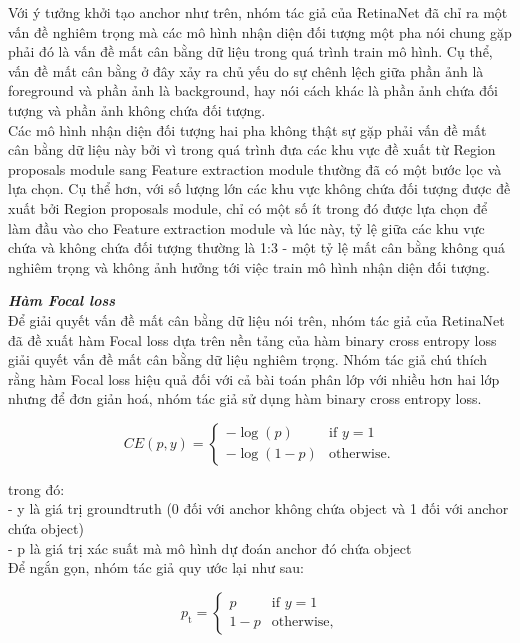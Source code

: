 {    \noindent
    Với ý tưởng khởi tạo anchor như trên, nhóm tác giả của RetinaNet đã chỉ ra một vấn đề nghiêm trọng mà các mô hình nhận diện đối tượng một pha nói chung gặp phải đó là vấn đề mất cân bằng dữ liệu trong quá trình train mô hình.
    Cụ thể, vấn đề mất cân bằng ở đây xảy ra chủ yếu do sự chênh lệch giữa phần ảnh là foreground và phần ảnh là background, hay nói cách khác là phần ảnh chứa đối tượng và phần ảnh không chứa đối tượng. \\
    Các mô hình nhận diện đối tượng hai pha không thật sự gặp phải vấn đề mất cân bằng dữ liệu này bởi vì trong quá trình đưa các khu vực đề xuất từ Region proposals module sang Feature extraction module thường đã có một bước lọc và lựa chọn.
    Cụ thể hơn, với số lượng lớn các khu vực không chứa đối tượng được đề xuất bởi Region proposals module, chỉ có một số ít trong đó được lựa chọn để làm đầu vào cho Feature extraction module và lúc này, tỷ lệ giữa các khu vực chứa và không chứa đối tượng thường là 1:3 - một tỷ lệ mất cân bằng không quá nghiêm trọng và không ảnh hưởng tới việc train mô hình nhận diện đối tượng.

    \noindent
    \textbf{\textit{Hàm Focal loss}} \\
    Để giải quyết vấn đề mất cân bằng dữ liệu nói trên, nhóm tác giả của RetinaNet đã đề xuất hàm Focal loss dựa trên nền tảng của hàm binary cross entropy loss giải quyết vấn đề mất cân bằng dữ liệu nghiêm trọng.
    Nhóm tác giả chú thích rằng hàm Focal loss hiệu quả đối với cả bài toán phân lớp với nhiều hơn hai lớp nhưng để đơn giản hoá, nhóm tác giả sử dụng hàm binary cross entropy loss.

    \begin{equation}
        \label{eq:bce}
        CE(p,y) = 
        \begin{cases}
            -\log(p) &\text{if $y = 1$} \\
            -\log (1 - p) &\text{otherwise.}
        \end{cases}
    \end{equation}

    \noindent
    trong đó: \\
    - y là giá trị groundtruth (0 đối với anchor không chứa object và 1 đối với anchor chứa object) \\
    - p là giá trị xác suất mà mô hình dự đoán anchor đó chứa object \\
    Để ngắn gọn, nhóm tác giả quy ước lại như sau:

    \begin{equation}
        \label{eq:bce}
        p_\textrm{t} =
        \begin{cases}
            p &\text{if $y = 1$} \\
            1 - p &\text{otherwise,}
        \end{cases}
    \end{equation}

}
